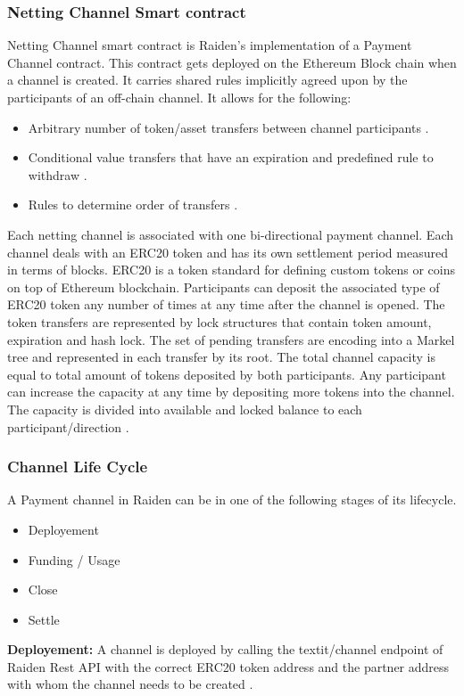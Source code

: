 \subsubsection{Netting Channel Smart contract} \label{NCSC}	
Netting Channel smart contract is Raiden’s implementation of a Payment Channel contract. This contract gets deployed on the Ethereum Block chain when a channel is created. It carries shared rules implicitly agreed upon by the participants of an off-chain channel. It allows for the following: \cite{rad:001}
\begin{itemize}

\item Arbitrary number of token/asset transfers between channel participants \cite{rad:001}.
\item Conditional value transfers that have an expiration and predefined rule to withdraw \cite{rad:001}.
\item Rules to determine order of transfers \cite{rad:001}.

\end{itemize}
Each netting channel is associated with one bi-directional payment channel. Each channel deals with an ERC20 token and has its own settlement period measured in terms of blocks. ERC20 is a token standard for defining custom tokens or coins on top of Ethereum blockchain. Participants can deposit the associated type of ERC20 token any number of times at any time after the channel is opened. The token transfers are represented by lock structures that contain token amount, expiration and hash lock. The set of pending transfers are encoding into a Markel tree and represented in each transfer by its root. The total channel capacity is equal to total amount of tokens deposited by both participants. Any participant can increase the capacity at any time by depositing more tokens into the channel. The capacity is divided into available and locked balance to each participant/direction \cite{rad:001}.

\subsubsection{Channel Life Cycle} \label{CLC}	
A Payment channel in Raiden can be in one of the following stages of its lifecycle.
\begin{itemize}

\item Deployement
\item Funding / Usage
\item Close
\item Settle
\end{itemize}
\textbf{Deployement:} A channel is deployed by calling the textit{/channel} endpoint of Raiden Rest API with the correct ERC20 token address and the partner address with whom the channel needs to be created \cite{rad:001}.

